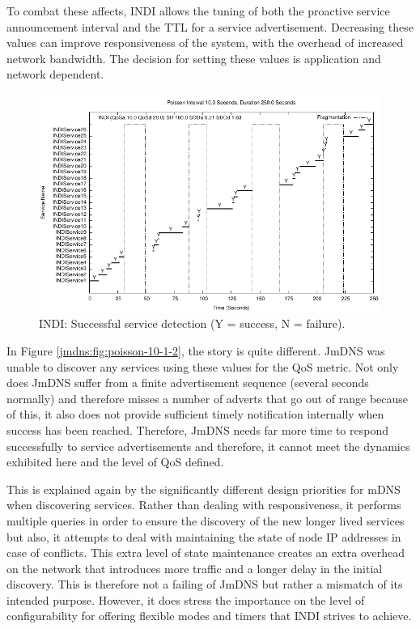 To combat these affects, INDI allows the tuning of both the proactive service announcement interval and the TTL for a service advertisement. Decreasing these values can improve responsiveness of the system, with the overhead of increased network bandwidth.  The decision for setting these values is application and network dependent. 

\begin{figure}[htb]
\centering
\includegraphics[scale=1.0]{indi10-10-20-results-distribution.pdf}
\caption{INDI: Successful service detection (Y = success, N = failure).} 
\label{indi:fig:poisson-10-10-20}
\end{figure}


In Figure \ref{jmdns:fig:poisson-10-1-2}, the story is quite different.  JmDNS was unable to discover any services using these values for the QoS metric. Not only does JmDNS suffer from a finite advertisement sequence (several seconds normally) and therefore misses a number of adverts that go out of range because of this, it also does not provide sufficient timely notification internally when success has been reached. Therefore, JmDNS needs far more time to respond successfully to service advertisements and therefore, it cannot meet the dynamics exhibited here and the level of QoS defined.  

This is explained again by the significantly different design priorities for mDNS when discovering services.  Rather than dealing with responsiveness, it performs multiple queries in order to ensure the discovery of the new longer lived services but also, it attempts to deal with maintaining the state of node IP addresses in case of conflicts.  This extra level of state maintenance creates an extra overhead on the network that introduces more traffic and a longer delay in the initial discovery. This is therefore not a failing of JmDNS but rather a mismatch of its intended purpose. However, it does stress the importance on the level of configurability for offering flexible modes and timers that INDI strives to achieve.

